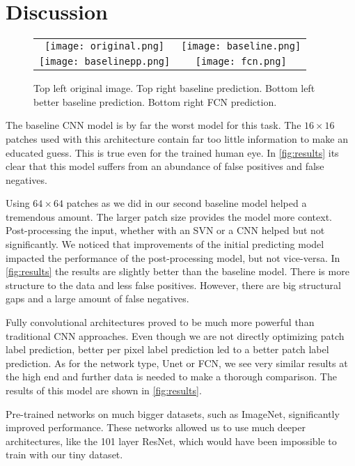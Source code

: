 \section{Discussion}
\begin{figure}[h]
    \centering
    \begin{tabular}{cc}
        \texttt{[image: original.png]} & \texttt{[image: baseline.png]} \\
        \texttt{[image: baselinepp.png]} & \texttt{[image: fcn.png]} \\
    \end{tabular}
    \caption{Top left original image. Top right baseline prediction. Bottom left better baseline prediction. Bottom right FCN prediction.}
    \label{fig:results}
\end{figure}

The baseline CNN model is by far the worst model for this task. The $16 \times 16$ patches used with this architecture contain far too little information to make an educated guess. This is true even for the trained human eye. In \autoref{fig:results} its clear that this model suffers from an abundance of false positives and false negatives.

Using $64 \times 64$ patches as we did in our second baseline model helped a tremendous amount. The larger patch size provides the model more context. Post-processing the input, whether with an SVN or a CNN helped but not significantly. We noticed that improvements of the initial predicting model impacted the performance of the post-processing model, but not vice-versa. In \autoref{fig:results} the results are slightly better than the baseline model. There is more structure to the data and less false positives. However, there are big structural gaps and a large amount of false negatives.

Fully convolutional architectures proved to be much more powerful than traditional CNN approaches. Even though we are not directly optimizing patch label prediction, better per pixel label prediction led to a better patch label prediction. As for the network type, Unet or FCN, we see very similar results at the high end and further data is needed to make a thorough comparison. The results of this model are shown in \autoref{fig:results}.

Pre-trained networks on much bigger datasets, such as ImageNet, significantly improved performance. These networks allowed us to use much deeper architectures, like the 101 layer ResNet, which would have been impossible to train with our tiny dataset.
